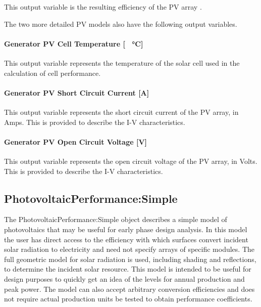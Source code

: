 This output variable is the resulting efficiency of the PV array .

The two more detailed PV models also have the following output variables.

\paragraph{Generator PV Cell Temperature {[} \SI{}{\celsius}{]}}\label{generator-pv-cell-temperature-c}

This output variable represents the temperature of the solar cell used in the calculation of cell performance.

\paragraph{Generator PV Short Circuit Current {[}A{]}}\label{generator-pv-short-circuit-current-a}

This output variable represents the short circuit current of the PV array, in Amps. This is provided to describe the I-V characteristics.

\paragraph{Generator PV Open Circuit Voltage {[}V{]}}\label{generator-pv-open-circuit-voltage-v}

This output variable represents the open circuit voltage of the PV array, in Volts. This is provided to describe the I-V characteristics.

\subsection{PhotovoltaicPerformance:Simple}\label{photovoltaicperformancesimple}

The PhotovoltaicPerformance:Simple object describes a simple model of photovoltaics that may be useful for early phase design analysis. In this model the user has direct access to the efficiency with which surfaces convert incident solar radiation to electricity and need not specify arrays of specific modules. The full geometric model for solar radiation is used, including shading and reflections, to determine the incident solar resource. This model is intended to be useful for design purposes to quickly get an idea of the levels for annual production and peak power. The model can also accept arbitrary conversion efficiencies and does not require actual production units be tested to obtain performance coefficients.

